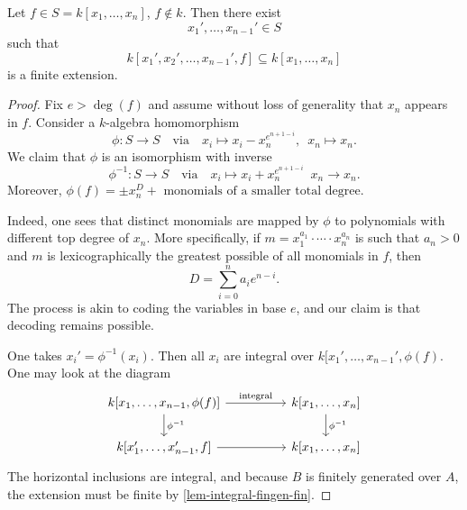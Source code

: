 \begin{lemma}
  \label{nagata}
  Let $f \in S = k[x_1, \dotsc, x_n]$, $f \notin k$. Then there exist \[x_1', \dotsc, x_{n-1}' \in S\] such that
  \[k[x_1', x_2', \dotsc, x_{n-1}', f] \subseteq k[x_1, \dotsc, x_n]\]
  is a finite extension.
\end{lemma}
\begin{proof}
  Fix $e > \deg(f)$ and assume without loss of generality that $x_n$ appears in $f$. Consider a $k$-algebra homomorphism
  \[ \phi \colon S \to S \quad \text{via} \quad x_i \mapsto x_i - x_n^{e^{n+1-i}}, \enspace x_n \mapsto x_n.\]
  We claim that $\phi$ is an isomorphism with inverse
  \[ \phi^{-1} \colon S \to S \quad \text{via} \quad x_i \mapsto x_i + x_n^{e^{n+1-i}} \enspace x_n \to x_n.\]
  Moreover, $\phi(f) = \pm x_n^D + \text{ monomials of a smaller total degree}$.

  Indeed, one sees that distinct monomials are mapped by $\phi$ to polynomials with different top degree of $x_n$. More specifically, if $m = x_1^{a_1} \cdot \dotsb \cdot x_n^{a_n}$ is such that $a_n > 0$ and $m$ is lexicographically the greatest possible of all monomials in $f$, then
  \[ D = \sum_{i=0}^n a_i e^{n-i}.\]
  The process is akin to coding the variables in base $e$, and our claim is that decoding remains possible.

  One takes $x_i' = \phi^{-1}(x_i)$. Then all $x_i$ are integral over $k[x_1', \dotsc, x_{n-1}', \phi(f)$. One may look at the diagram
  \[
  \begin{tikzcd}[column sep = huge]
    k[x_1, \dotsc, x_{n-1}, \phi(f)] \arrow{r}{\text{integral}} \arrow{d}{\phi^{-1}}
    & k[x_1, \dotsc, x_n] \arrow{d}{\phi^{-1}} \\
    k[x_1', \dotsc, x_{n-1}', f] \arrow{r}
    & k[x_1, \dotsc, x_n]
  \end{tikzcd}
  \]
  The horizontal inclusions are integral, and because $B$ is finitely generated over $A$, the extension must be finite by \cref{lem-integral-fingen-fin}.
\end{proof}

